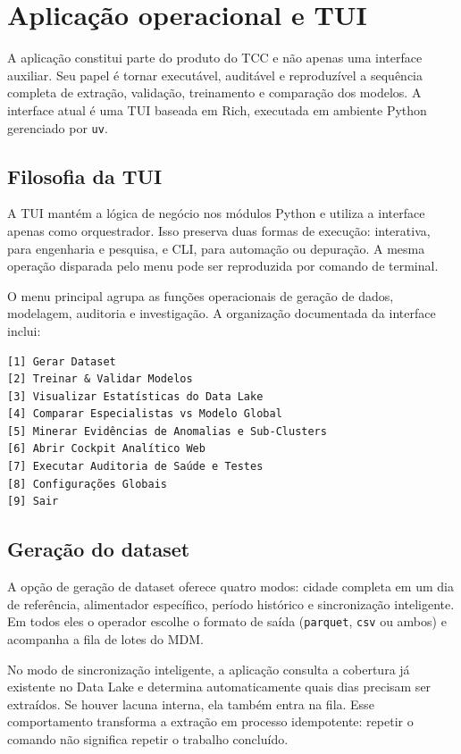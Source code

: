 \chapter{Aplicação operacional e TUI}\label{aplicauxe7uxe3o-operacional-e-tui}

A aplicação constitui parte do produto do TCC e não apenas uma interface auxiliar. Seu papel é tornar executável, auditável e reproduzível a sequência completa de extração, validação, treinamento e comparação dos modelos. A interface atual é uma TUI baseada em Rich, executada em ambiente Python gerenciado por \texttt{uv}.

\section{Filosofia da TUI}\label{filosofia-da-tui}

A TUI mantém a lógica de negócio nos módulos Python e utiliza a interface apenas como orquestrador. Isso preserva duas formas de execução: interativa, para engenharia e pesquisa, e CLI, para automação ou depuração. A mesma operação disparada pelo menu pode ser reproduzida por comando de terminal.

O menu principal agrupa as funções operacionais de geração de dados, modelagem, auditoria e investigação. A organização documentada da interface inclui:

\begin{verbatim}
[1] Gerar Dataset
[2] Treinar & Validar Modelos
[3] Visualizar Estatísticas do Data Lake
[4] Comparar Especialistas vs Modelo Global
[5] Minerar Evidências de Anomalias e Sub-Clusters
[6] Abrir Cockpit Analítico Web
[7] Executar Auditoria de Saúde e Testes
[8] Configurações Globais
[9] Sair
\end{verbatim}

\section{Geração do dataset}\label{gerauxe7uxe3o-do-dataset}

A opção de geração de dataset oferece quatro modos: cidade completa em um dia de referência, alimentador específico, período histórico e sincronização inteligente. Em todos eles o operador escolhe o formato de saída (\texttt{parquet}, \texttt{csv} ou ambos) e acompanha a fila de lotes do MDM.

No modo de sincronização inteligente, a aplicação consulta a cobertura já existente no Data Lake e determina automaticamente quais dias precisam ser extraídos. Se houver lacuna interna, ela também entra na fila. Esse comportamento transforma a extração em processo idempotente: repetir o comando não significa repetir o trabalho concluído.

